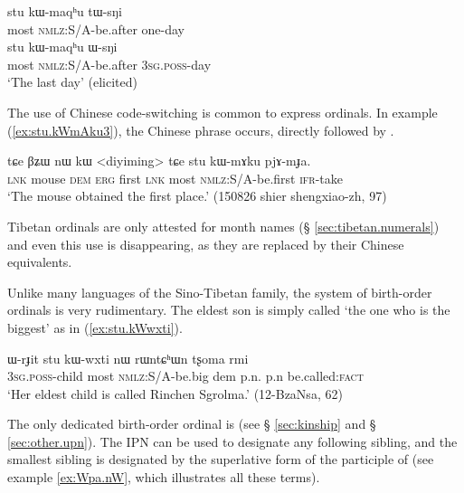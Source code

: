 \begin{exe}
\ex \label{ex:stu.kWmaqhu.tWsNi}
\gll  stu kɯ-maqʰu tɯ-sŋi  \\
 most \textsc{nmlz}:S/A-be.after one-day \\
 \ex \label{ex:stu.kWmaqhu.WsNi}
\gll  stu kɯ-maqʰu ɯ-sŋi  \\
 most \textsc{nmlz}:S/A-be.after \textsc{3sg}.\textsc{poss}-day \\
\glt `The last day' (elicited)
\end{exe}

The use of Chinese code-switching is common to express ordinals. In example (\ref{ex:stu.kWmAku3}), the Chinese phrase  occurs, directly followed by .

\begin{exe}
\ex  \label{ex:stu.kWmAku3}
\gll tɕe βʑɯ nɯ kɯ <diyiming> tɕe stu kɯ-mɤku pjɤ-mɟa. \\
 \textsc{lnk} mouse \textsc{dem} \textsc{erg} first \textsc{lnk} most \textsc{nmlz}:S/A-be.first \textsc{ifr}-take \\
\glt `The mouse obtained the first place.' (150826 shier shengxiao-zh, 97)
\end{exe}

Tibetan ordinals are only attested for month names (§ \ref{sec:tibetan.numerals}) and even this use is disappearing, as they are replaced by their Chinese equivalents.

Unlike many languages of the Sino-Tibetan family, the system of birth-order ordinals is very rudimentary. The eldest son is simply called  `the one who is the biggest' as in (\ref{ex:stu.kWwxti}).

\begin{exe}
\ex  \label{ex:stu.kWwxti}
\gll ɯ-rɟit stu kɯ-wxti nɯ rɯntɕʰɯn tʂoma rmi\\
\textsc{3sg}.\textsc{poss}-child most \textsc{nmlz}:S/A-be.big dem p.n. p.n be.called:\textsc{fact}\\
\glt `Her eldest child is called Rinchen Sgrolma.' (12-BzaNsa, 62)
\end{exe}

The only dedicated birth-order ordinal is  (see § \ref{sec:kinship} and § \ref{sec:other.upn}). The IPN  can be used to designate any following sibling, and the smallest sibling is designated by the superlative form of the participle of  (see example \ref{ex:Wpa.nW}, which illustrates all these terms).

